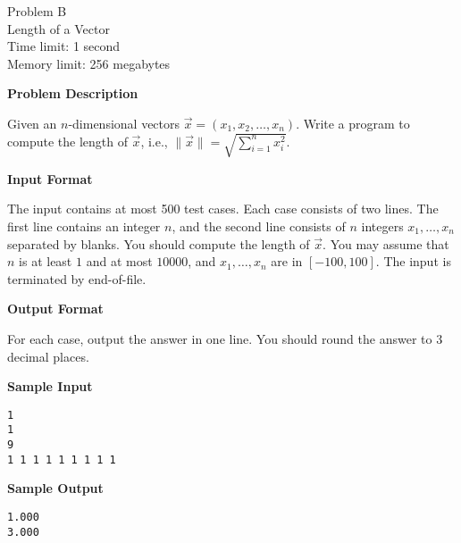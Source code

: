 \documentclass[11pt]{article}
\begin{document}
\begin{center}
    {\LARGE Problem B}\\
    {\Large Length of a Vector}\\
    {Time limit: 1 second}\\
    {Memory limit: 256 megabytes}
\end{center}

\textbf{\large Problem Description}

Given an $n$-dimensional vectors $\vec{x}=(x_1,x_2,\dots,x_n)$. Write a program to compute the length of $\vec{x}$, i.e., 
$\|\vec{x}\|=\sqrt{\sum_{i=1}^nx_i^2}$.

\textbf{\large Input Format}

The input contains at most 500 test cases. 
Each case consists of two lines. The first line contains an integer $n$, 
and the second line consists of $n$ integers $x_1,\dots,x_n$ separated by 
blanks. 
You should compute the length of $\vec{x}$. 
You may assume that $n$ is at least $1$ and at most $10000$,
and $x_1,\dots,x_n$ are in $[-100,100]$.
The input is terminated by end-of-file.

\textbf{\large Output Format}

For each case, output the answer in one line. You should round the answer
to 3 decimal places.

\textbf{\large Sample Input}

\begin{verbatim}
1
1
9
1 1 1 1 1 1 1 1 1
\end{verbatim}

\textbf{\large Sample Output}
\begin{verbatim}
1.000
3.000
\end{verbatim}
\end{document}
